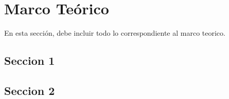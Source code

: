 \chapter{Marco Teórico}

En esta sección, debe incluir todo lo correspondiente al marco teorico.

\section{Seccion 1}

\section{Seccion 2}